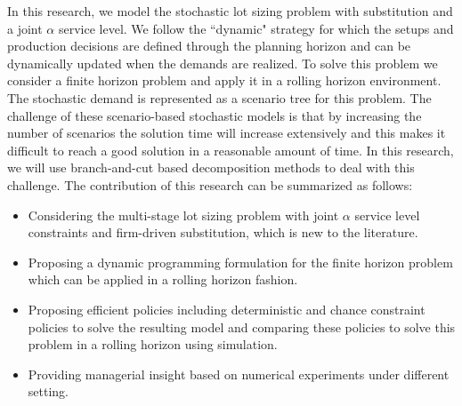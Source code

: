 \documentclass[10pt]{article}
\begin{document}
In this research, we model the stochastic lot sizing problem with substitution and a joint $\alpha$ service level.
We follow the ``dynamic" strategy \cite{bookbinder1988strategies} for which the setups and production decisions are defined through the planning horizon and can be dynamically updated when the demands are realized. To solve this problem we consider a finite horizon problem and apply it in a rolling horizon environment. The stochastic demand is represented as a scenario tree for this problem.  
The challenge of these scenario-based stochastic models is that by increasing the number of scenarios the solution time will increase extensively and this makes it difficult to reach a good solution in a reasonable amount of time. In this research, we will use branch-and-cut based decomposition methods to deal with this challenge. 
The contribution of this research can be summarized as follows:

    
\begin{itemize}

\item Considering the multi-stage lot sizing problem with joint $\alpha$ service level constraints and firm-driven substitution, which is new to the literature.
  
\item Proposing a dynamic programming formulation for the finite horizon problem which can be applied in a rolling horizon fashion.


\item Proposing efficient policies including deterministic and chance constraint policies to solve the resulting model and comparing these policies to solve this problem in a rolling horizon using simulation.

\item Providing managerial insight based on numerical experiments under different setting.%
    


\end{itemize}
\end{document}
